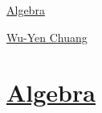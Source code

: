 \documentclass[11pt]{article}
\begin{document}
	\kaishu 
	\setcounter{section}{0}
	\begin{center}
		{\LARGE  \href{https://en.wikipedia.org/wiki/Algebra}{Algebra}}
		
		
		{\large \href{https://www.math.ntu.edu.tw/entity_people/entity_people/21516}{Wu-Yen Chuang}}
	\end{center}
\setcounter{page}{1}



\vspace{-1cm}

\section*{\href{https://www.youtube.com/playlist?list=PLQqeHUV7RZ2OmZ2AjTbTAu-n04LfH_Mjt}{Algebra }}
\end{document}

